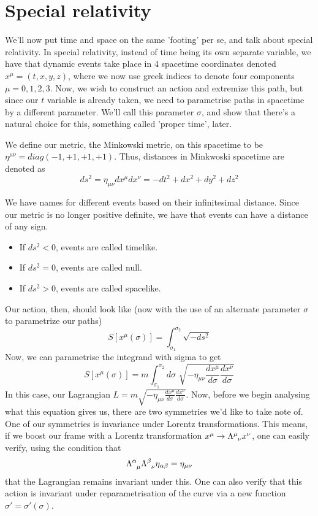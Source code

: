 \section{Special relativity} 
We'll now put time and space on the same 'footing' per se, and talk about special relativity. In special relativity, instead of time being its own separate variable, we have that dynamic events take place in 4 spacetime coordinates denoted $x^\mu  = (t, x, y, z)$, where we now use greek indices to denote four components $\mu = 0, 1, 2 , 3$. Now, we wish to construct an action and extremize this path, but since our $t$ variable is already taken, we need to parametrise paths in spacetime by a different parameter. We'll call this parameter $\sigma$, and show that there's a natural choice for this, something called 'proper time', later. 

We define our metric, the Minkowski metric, on this spacetime to be $\eta^{ \mu\nu} = diag( -1, +1, +1, +1) $. Thus, distances in Minkwoski spacetime are denoted as \[ 
ds^2  = \eta_{ \mu \nu} dx^\mu dx^\nu  =  -dt^2 + dx^2 + dy^2 + dz^2 \] 

We have names for different events based on their infinitesimal distance. Since our metric is no longer positive definite, we have that events can have a distance of any sign. 

\begin{itemize} 
\item If $ds^2 < 0$, events are called timelike. 
\item If $ds^2 = 0$, events are called null. 
\item If $ds^2 > 0$, events are called spacelike. 
\end{itemize} 


Our action, then, should look like (now with the use of an alternate parameter $\sigma$ to parametrize our paths) 
\[ 
S[ x^\mu ( \sigma) ] = \int_{ \sigma_1}^{\sigma_2} \sqrt{ - ds^2 } \]
Now, we can parametrise the integrand with sigma to get 
\[ 
S[x^\mu (\sigma) ] = m \int_{\sigma_1}^{ \sigma_2 } d\sigma \, \,  \sqrt{ - \eta_{ \mu \nu} \frac{ d x^\mu}{ d \sigma} \frac{ dx^\nu}{ d \sigma} } 
\] 
In this case, our Lagrangian $L = 
m \sqrt{ - \eta_{ \mu \nu} \frac{ d x^\mu}{ d \sigma} \frac{ dx^\nu}{ d \sigma} }$. Now, before we begin analysing what this equation gives us, there are two symmetries we'd like to take note of. One of our symmetries is invariance under Lorentz transformations. This means, if we boost our frame with a Lorentz transformation $x^\mu \rightarrow \Lambda\indices{^\mu_\nu} x^\nu $, one can easily verify, using the condition that \[ 
\Lambda\indices{^\alpha_\mu} \Lambda\indices{^\beta_\nu} \eta_{\alpha\beta} = \eta_{ \mu \nu} 
\] 
that the Lagrangian remains invariant under this. One can also verify that this action is invariant under reparametrisation of the curve via a new function $\sigma' = \sigma' ( \sigma)$.  


